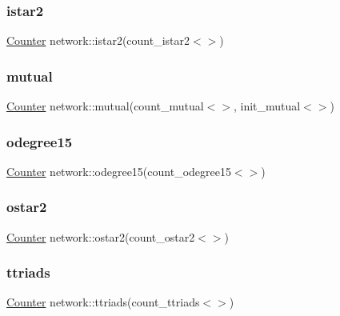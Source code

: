 \mbox{\label{namespacenetwork_a74894f9f1d7622157302ea78900c4588}} 
\subsubsection{\texorpdfstring{istar2}{istar2}}
{\footnotesize\ttfamily \hyperlink{class_counter}{Counter} network\+::istar2(count\+\_\+istar2$<$$>$)}

\mbox{\label{namespacenetwork_af7c6b60d469c6e5ffeab54921348559f}} 
\subsubsection{\texorpdfstring{mutual}{mutual}}
{\footnotesize\ttfamily \hyperlink{class_counter}{Counter} network\+::mutual(count\+\_\+mutual$<$$>$, init\+\_\+mutual$<$$>$)}

\mbox{\label{namespacenetwork_abed29a2d0af7a333b4ce60f4dcce9536}} 
\subsubsection{\texorpdfstring{odegree15}{odegree15}}
{\footnotesize\ttfamily \hyperlink{class_counter}{Counter} network\+::odegree15(count\+\_\+odegree15$<$$>$)}

\mbox{\label{namespacenetwork_a7cfef2b0af2906a409488cb829297efe}} 
\subsubsection{\texorpdfstring{ostar2}{ostar2}}
{\footnotesize\ttfamily \hyperlink{class_counter}{Counter} network\+::ostar2(count\+\_\+ostar2$<$$>$)}

\mbox{\label{namespacenetwork_ad77db655dd3871b9b12e16ec46c49625}} 
\subsubsection{\texorpdfstring{ttriads}{ttriads}}
{\footnotesize\ttfamily \hyperlink{class_counter}{Counter} network\+::ttriads(count\+\_\+ttriads$<$$>$)}

